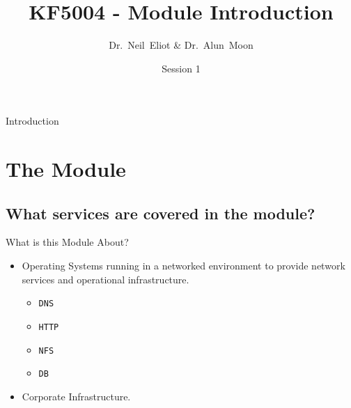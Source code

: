\documentclass[aspectratio=169]{beamer}
\title{KF5004 - Module Introduction}
\author{Dr.~Neil~Eliot \& Dr.~Alun~Moon}
\institute[Northumbria University] %
{
  Department of Computer and Information Sciences\\
  University of Northumbria
}
\date{Session 1}
\begin{document}
\begin{frame}
  \titlepage
\end{frame}

\begin{frame}{Introduction}
  \tableofcontents
\end{frame}


\section{The Module}
\subsection{What services are covered in the module?}
\begin{frame}{What is this Module About?}
  \begin{itemize}
    \item Operating Systems running in a networked environment to provide network services and operational infrastructure.
    \begin{itemize}
      \item \texttt{DNS}
      \item \texttt{HTTP}
      \item \texttt{NFS}
      \item \texttt{DB}
    \end{itemize}
    \item Corporate Infrastructure.
  \end{itemize}
\end{frame}
\end{document}
